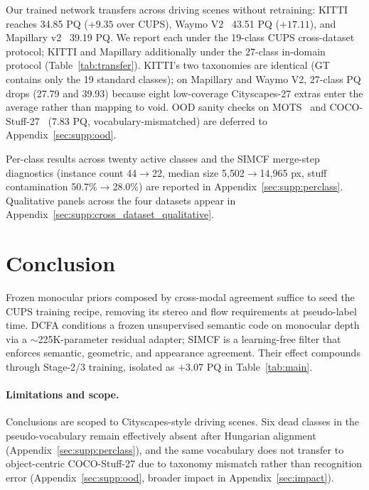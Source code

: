 \documentclass{article}
\begin{document}
Our trained network transfers across driving scenes without retraining: KITTI~\cite{geiger2012kitti} reaches 34.85 PQ ($+9.35$ over CUPS), Waymo V2~\cite{sun2020waymo} 43.51 PQ ($+17.11$), and Mapillary v2~\cite{neuhold2017mapillary} 39.19 PQ. We report each under the 19-class CUPS cross-dataset protocol; KITTI and Mapillary additionally under the 27-class in-domain protocol (Table~\ref{tab:transfer}). KITTI's two taxonomies are identical (GT contains only the 19 standard classes); on Mapillary and Waymo V2, 27-class PQ drops (27.79 and 39.93) because eight low-coverage Cityscapes-27 extras enter the average rather than mapping to void. OOD sanity checks on MOTS~\cite{voigtlaender2019mots} and COCO-Stuff-27~\cite{caesar2018coco} (7.83 PQ, vocabulary-mismatched) are deferred to Appendix~\ref{sec:supp:ood}.

Per-class results across twenty active classes and the SIMCF merge-step diagnostics (instance count 44$\to$22, median size 5{,}502$\to$14{,}965 px, stuff contamination 50.7\%$\to$28.0\%) are reported in Appendix~\ref{sec:supp:perclass}. Qualitative panels across the four datasets appear in Appendix~\ref{sec:supp:cross_dataset_qualitative}.


\FloatBarrier
\section{Conclusion}
\label{sec:conclusion}

Frozen monocular priors composed by cross-modal agreement suffice to seed the CUPS training recipe, removing its stereo and flow requirements at pseudo-label time. DCFA conditions a frozen unsupervised semantic code on monocular depth via a $\sim$225K-parameter residual adapter; SIMCF is a learning-free filter that enforces semantic, geometric, and appearance agreement. Their effect compounds through Stage-2/3 training, isolated as $+3.07$ PQ in Table~\ref{tab:main}.

\paragraph{Limitations and scope.}
Conclusions are scoped to Cityscapes-style driving scenes. Six dead classes in the pseudo-vocabulary remain effectively absent after Hungarian alignment (Appendix~\ref{sec:supp:perclass}), and the same vocabulary does not transfer to object-centric COCO-Stuff-27 due to taxonomy mismatch rather than recognition error (Appendix~\ref{sec:supp:ood}, broader impact in Appendix~\ref{sec:impact}).
\end{document}

